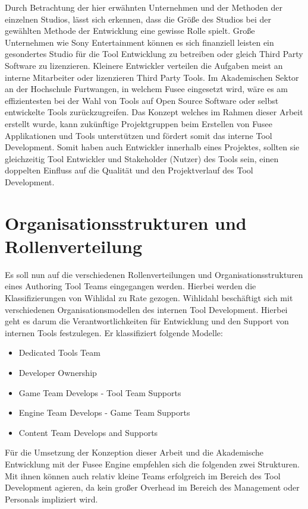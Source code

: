 \documentclass[pagesize, paper=a4, fontsize=12pt, titlepage=true, headings=small, headnosepline, abstractoff, liststotoc, nochapterprefix, plainheadsepline, twoside]{scrreprt}
\begin{document}
Durch Betrachtung der hier erwähnten Unternehmen und der Methoden der einzelnen Studios, lässt sich erkennen, dass die Größe des Studios bei der gewählten Methode der Entwicklung eine gewisse Rolle spielt. Große Unternehmen wie Sony Entertainment können es sich finanziell leisten ein gesondertes Studio für die Tool Entwicklung zu betreiben oder gleich Third Party Software zu lizenzieren. Kleinere Entwickler verteilen die Aufgaben meist an interne Mitarbeiter oder lizenzieren Third Party Tools. Im Akademischen Sektor an der Hochschule Furtwangen, in welchem Fusee eingesetzt wird, wäre es am effizientesten bei der Wahl von Tools auf Open Source Software oder selbst entwickelte Tools zurückzugreifen. Das Konzept welches im Rahmen dieser Arbeit erstellt wurde, kann zukünftige Projektgruppen beim Erstellen von Fusee Applikationen und Tools unterstützen und fördert somit das interne Tool Development. Somit haben auch Entwickler innerhalb eines Projektes, sollten sie gleichzeitig Tool Entwickler und Stakeholder (Nutzer) des Tools sein, einen doppelten Einfluss auf die Qualität und den Projektverlauf des Tool Development.

\section{Organisationsstrukturen und Rollenverteilung}
Es soll nun auf die verschiedenen Rollenverteilungen und Organisationsstrukturen eines Authoring Tool Teams eingegangen werden. Hierbei werden die Klassifizierungen von Wihlidal zu Rate gezogen.
Wihlidahl \autocite[S. 5]{Wihlidal2006} beschäftigt sich mit verschiedenen Organisationsmodellen des internen Tool Development. Hierbei geht es darum die Verantwortlichkeiten für Entwicklung und den Support von internen Tools festzulegen. Er klassifiziert folgende Modelle:
\begin{itemize}
\item Dedicated Tools Team
\item Developer Ownership
\item Game Team Develops - Tool Team Supports
\item Engine Team Develops - Game Team Supports
\item Content Team Develops and Supports
\end{itemize}

Für die Umsetzung der Konzeption dieser Arbeit und die Akademische Entwicklung mit der Fusee Engine empfehlen sich die folgenden zwei Strukturen. Mit ihnen können auch relativ kleine Teams erfolgreich im Bereich des Tool Development agieren, da kein großer Overhead im Bereich des Management oder Personals impliziert wird.
\end{document}

